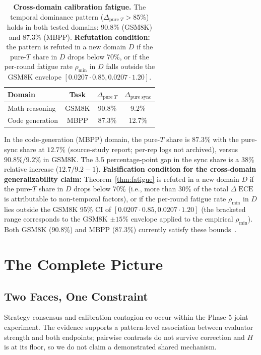 \documentclass[11pt]{article}
\DeclareMathOperator{\ECE}{ECE}
\begin{document}
\begin{table}[H]
\centering
\caption{\textbf{Cross-domain calibration fatigue.} The temporal dominance pattern ($\Delta_{\text{pure } T} > 85\%$) holds in both tested domains: 90.8\% (GSM8K) and 87.3\% (MBPP). \textbf{Refutation condition:} the pattern is refuted in a new domain $D$ if the pure-$T$ share in $D$ drops below 70\%, or if the per-round fatigue rate $\rho_{\min}$ in $D$ falls outside the GSM8K envelope $[0.0207 \cdot 0.85, 0.0207 \cdot 1.20]$.}
\begin{tabular}{@{}lccc@{}}
\toprule
Domain & Task & $\Delta_{\text{pure } T}$ & $\Delta_{\text{pure sync}}$ \\
\midrule
Math reasoning & GSM8K & 90.8\% & 9.2\% \\
Code generation & MBPP & 87.3\% & 12.7\% \\
\bottomrule
\end{tabular}
\end{table}

In the code-generation (MBPP) domain, the pure-$T$ share is $87.3\%$ with the pure-sync share at $12.7\%$ (source-study report; per-rep logs not archived), versus $90.8\% / 9.2\%$ in GSM8K. The 3.5 percentage-point gap in the sync share is a 38\% relative increase ($12.7 / 9.2 - 1$). \textbf{Falsification condition for the cross-domain generalizability claim:} Theorem~\ref{thm:fatigue} is refuted in a new domain $D$ if the pure-$T$ share in $D$ drops below 70\% (i.e., more than 30\% of the total $\Delta\ECE$ is attributable to non-temporal factors), or if the per-round fatigue rate $\rho_{\min}$ in $D$ lies outside the GSM8K 95\% CI of $[0.0207 \cdot 0.85, 0.0207 \cdot 1.20]$ (the bracketed range corresponds to the GSM8K $\pm 15\%$ envelope applied to the empirical $\rho_{\min}$). Both GSM8K ($90.8\%$) and MBPP ($87.3\%$) currently satisfy these bounds~\citep{sun2020test,temporal2026}.

\section{The Complete Picture}

\subsection{Two Faces, One Constraint}

Strategy consensus and calibration contagion co-occur within the Phase-5 joint experiment. The evidence supports a pattern-level association between evaluator strength and both endpoints; pairwise contrasts do not survive correction and $H$ is at its floor, so we do not claim a demonstrated shared mechanism.
\end{document}
